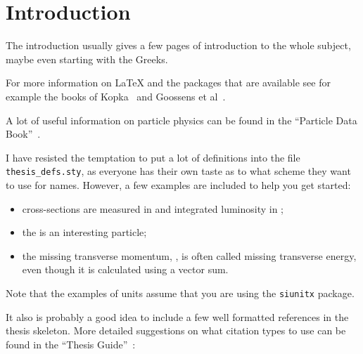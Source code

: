 
\chapter{Introduction}
\label{sec:intro}

The introduction usually gives a few pages of introduction to the
whole subject, maybe even starting with the Greeks.

For more information on \LaTeX{} and the packages that are available
see for example the books of Kopka~\citep{kopka04} and Goossens et
al~\citep{goossens04}.

A lot of useful information on particle physics can be found in the
\enquote{Particle Data Book}~\citep{pdg2010}.

I have resisted the temptation to put a lot of definitions into the
file \texttt{thesis\_defs.sty}, as everyone has their own taste as
to what scheme they want to use for names.
However, a few examples are included to help you get started:
\begin{itemize}
\setlength{\itemsep}{0pt}\setlength{\parskip}{0pt}
\item cross-sections are measured in \unit{\pb} and integrated
  luminosity in \unit{\invpb};
\item the \KoS is an interesting particle;
\item the missing transverse momentum, \pTmiss, is often called
  missing transverse energy, even though it is calculated using a vector sum.
\end{itemize}
Note that the examples of units assume that you are using the
\texttt{siunitx} package.

It also is probably a good idea to include a few well formatted
references in the thesis skeleton. More detailed suggestions on what
citation types to use can be found in the \enquote{Thesis Guide}~\cite{thesis-guide}:

